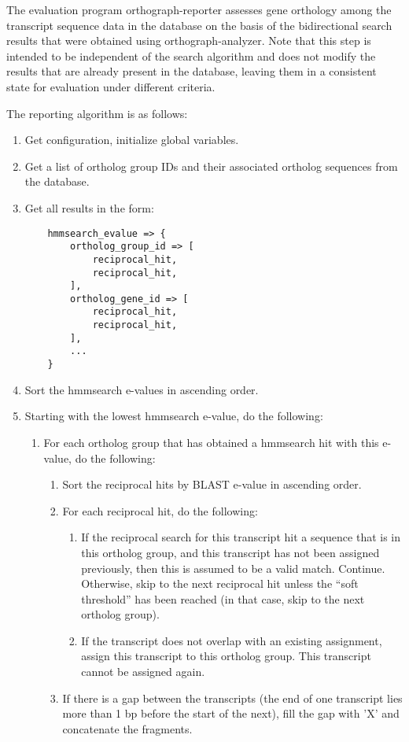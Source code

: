\label{sec:algorithm-reporting}
The evaluation program orthograph-reporter assesses gene orthology among the
transcript sequence data in the database on the basis of the bidirectional
search results that were obtained using orthograph-analyzer. Note that this step
is intended to be independent of the search algorithm and does not modify
the results that are already present in the database, leaving them in a
consistent state for evaluation under different criteria.

The reporting algorithm is as follows:

\begin{enumerate}
	\item Get configuration, initialize global variables.
	\item Get a list of ortholog group IDs and their associated ortholog sequences
		from the database.
	\item Get all results in the form:
	\begin{lstlisting}
	hmmsearch_evalue => {
		ortholog_group_id => [
			reciprocal_hit,
			reciprocal_hit,
		],
		ortholog_gene_id => [
			reciprocal_hit,
			reciprocal_hit,
		],
		...
	}
	\end{lstlisting}
	\item Sort the hmmsearch e-values in ascending order.
	\item Starting with the lowest hmmsearch e-value, do the following:
	\begin{enumerate}
		\item For each ortholog group that has obtained a hmmsearch hit with this
			e-value, do the following:
			\begin{enumerate}
				\item Sort the reciprocal hits by BLAST e-value in ascending order.
				\item For each reciprocal hit, do the following:
				\begin{enumerate}
					\item If the reciprocal search for this transcript hit a sequence that
						is in this ortholog group, and this transcript has not been assigned
						previously, then this is assumed to be a valid match. Continue.
						Otherwise, skip to the next reciprocal hit unless the ``soft
						threshold'' has been reached (in that case, skip to the next
						ortholog group).
					\item If the transcript does not overlap with an existing assignment,
						assign this transcript to this ortholog group. This transcript cannot
						be assigned again. 
				\end{enumerate}
			\item If there is a gap between the transcripts (the end of one transcript
				lies more than 1 bp before the start of the next), fill the gap with
				'X' and concatenate the fragments.
		\end{enumerate}
	\end{enumerate}
\end{enumerate}

